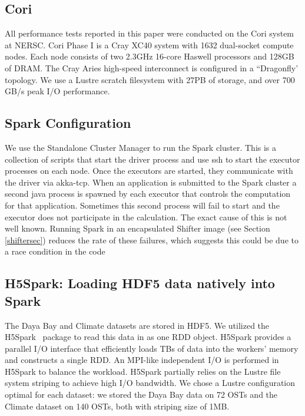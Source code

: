 \subsection{Cori}
All performance tests reported in this paper were conducted on the Cori system at NERSC. Cori Phase I is a Cray XC40 system with 1632 dual-socket compute nodes. Each node consists of two 2.3GHz 16-core Haswell processors and 128GB of DRAM. The Cray Aries high-speed interconnect is configured in a ``Dragonfly' topology. We use a Lustre scratch filesystem with 27PB of storage, and over 700 GB/s peak I/O performance. 

\subsection{Spark Configuration}
We use the Standalone Cluster Manager to run the Spark cluster. This is a collection of scripts that start the driver process and use ssh to start the executor processes on each node. Once the executors are started, they communicate with the driver via akka-tcp. When an application is submitted to the Spark cluster a second java process is spawned by each executor that controls the computation for that application. Sometimes this second process will fail to start and the executor does not participate in the calculation. The exact cause of this is not well known. Running Spark in an encapsulated Shifter image (see Section \ref{shiftersec}) reduces the rate of these failures, which suggests this could be due to a race condition in the code

\subsection{H5Spark: Loading HDF5 data natively into Spark}
The Daya Bay and Climate datasets are stored in HDF5. We utilized the H5Spark~\cite{h5spark-cug16} package to read this data in as one RDD object. H5Spark provides a parallel I/O interface that efficiently loads TBs of data into the workers' memory and constructs a single RDD. An MPI-like independent I/O is performed in H5Spark to balance the workload. H5Spark partially relies on the Lustre file system striping to achieve high I/O bandwidth. We chose a Lustre configuration optimal for each dataset: we stored the Daya Bay data on 72 OSTs and the Climate dataset on 140 OSTs, both with striping size of 1MB. 

